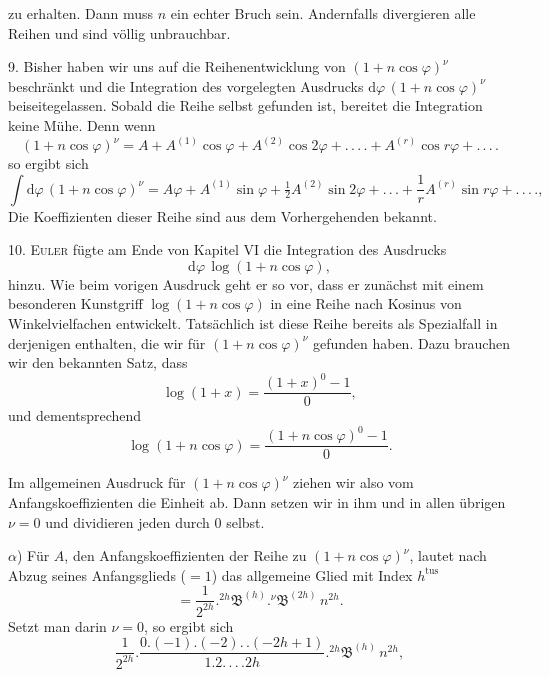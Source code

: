 zu erhalten. Dann muss $n$ ein echter Bruch sein. Andernfalls
divergieren alle Reihen und sind völlig unbrauchbar.

9. Bisher haben wir uns auf die Reihenentwicklung von $(1+n\cos\varphi)^{\nu}$ beschränkt und die Integration
des vorgelegten Ausdrucks $\mathrm{d}\varphi\,(1+n\cos\varphi)^{\nu}$ beiseitegelassen. Sobald die Reihe selbst gefunden ist,
bereitet die Integration keine Mühe. Denn wenn
\[
(1+n\cos\varphi)^{\nu} = A + A^{(1)}\cos\varphi + A^{(2)}\cos 2\varphi + .\,.\,.\,. + A^{(r)}\cos r\varphi + .\,.\,.\,.
\]
so ergibt sich
\[
\int \mathrm{d}\varphi\,(1+n\cos\varphi)^{\nu} = A\varphi + A^{(1)}\sin\varphi + \tfrac{1}{2}A^{(2)}\sin 2\varphi + .\,.\,. + \frac{1}{r}A^{(r)}\sin r\varphi + .\,.\,.\,.,
\]
Die Koeffizienten dieser Reihe sind aus dem Vorhergehenden bekannt.

10. \textsc{Euler} fügte am Ende von Kapitel VI die Integration des Ausdrucks
\[
\mathrm{d}\varphi\,\log(1+n\cos\varphi),
\]
hinzu. Wie beim vorigen Ausdruck geht er so vor, dass er zunächst mit einem besonderen Kunstgriff $\log(1+n\cos\varphi)$ in eine Reihe
nach Kosinus von Winkelvielfachen entwickelt. Tatsächlich
ist diese Reihe bereits als Spezialfall in derjenigen enthalten, die wir für $(1+n\cos\varphi)^{\nu}$ gefunden haben.
Dazu brauchen wir den bekannten Satz, dass
\[
\log(1+x) = \frac{(1+x)^{0}-1}{0},
\]
und dementsprechend
\[
\log(1+n\cos\varphi) = \frac{(1+n\cos\varphi)^{0}-1}{0}.
\]
\par\noindent\hspace*{\parindent}Im allgemeinen Ausdruck für $(1+n\cos\varphi)^{\nu}$ ziehen wir also vom Anfangskoeffizienten die Einheit ab.
Dann setzen wir in ihm und in allen übrigen $\nu=0$ und dividieren jeden durch $0$ selbst.

$\alpha$) Für $A$, den Anfangskoeffizienten der Reihe zu $(1+n\cos\varphi)^{\nu}$,
lautet nach Abzug seines Anfangsglieds ($=1$) das allgemeine Glied mit Index $h^{\mathrm{tus}}$
\[
= \frac{1}{2^{2h}} . {}^{2h}\mathfrak{B}^{(h)} . {}^{\nu}\mathfrak{B}^{(2h)}\,n^{2h}.
\]
Setzt man darin $\nu=0$, so ergibt sich
\[
\frac{1}{2^{2h}} . \frac{0.(-1).(-2).\,.(-2h+1)}{1.2.\,.\,.\,. 2h} . {}^{2h}\mathfrak{B}^{(h)}\,n^{2h},
\]

